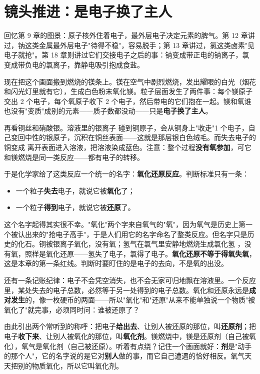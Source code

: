 \section{镜头推进：是电子换了主人}

回忆第 9 章的图景：原子核外住着电子，最外层电子决定元素的脾气。第 12 章讲过，钠这类金属最外层电子"待得不稳"，容易脱手；第 13 章讲过，氯这类卤素"见电子就抢"。第 18 章则讲过它们交接电子之后的事：钠变成带正电的钠离子，氯变成带负电的氯离子，靠静电吸引抱成食盐。

现在把这个画面搬到燃烧的镁条上。镁在空气中剧烈燃烧，发出耀眼的白光（烟花和闪光灯里就有它），生成白色粉末氧化镁。粒子层面发生了两件事：每个镁原子交出 2 个电子，每个氧原子收下 2 个电子，然后带电的它们抱在一起。镁和氧谁也没有"变质"成别的元素——质子数都没动——只是\textbf{电子换了主人}。

再看铜丝和硝酸银。溶液里的银离子  碰到铜原子，会从铜身上"收走"1 个电子，自己变回中性的银原子，沉积在铜丝表面——这就是那层银白色绒毛。而失去电子的铜变成  离开表面进入溶液，把溶液染成蓝色。注意：整个过程\textbf{没有氧参加}，可它和镁燃烧是同一类反应——都有电子的转移。

于是化学家给了这类反应一个统一的名字：\textbf{氧化还原反应}。判断标准只有一条：

\begin{itemize}[itemsep=2pt]
\item 一个粒子\textbf{失去}电子，就说它被\textbf{氧化}了；
\item 一个粒子\textbf{得到}电子，就说它被\textbf{还原}了。
\end{itemize}

这个名字起得其实很不幸。"氧化"两个字来自氧气的"氧"，因为氧气是历史上第一个被认出来的"抢电子高手"，于是人们用它的名字命名了整类反应。但名字只是历史的化石。铜被银离子氧化，没有氧；氢气在氯气里安静地燃烧生成氯化氢 ，没有氧，照样是氧化还原——氢失了电子，氯得了电子。\textbf{氧化还原不等于得氧失氧}，这是本章的第一条红线。判断时要盯住的是电子的去向，不是氧的出没。

还有一条记账纪律：电子不会凭空消失，也不会无家可归地飘在溶液里。一个反应里，某处失去的电子总数，必然等于另一处得到的电子总数。氧化和还原永远是\textbf{成对发生}的，像一枚硬币的两面——所以"氧化"和"还原"从来不能单独说一个物质"被氧化了"就完事，必须同时问：谁被还原了？

由此引出两个常听到的称呼：把电子\textbf{给出去}、让别人被还原的那位，叫\textbf{还原剂}；把电子\textbf{收下来}、让别人被氧化的那位，叫\textbf{氧化剂}。镁燃烧中，镁是还原剂（自己被氧化），氧气是氧化剂（自己被还原）。听着有点绕？记住一个画面就好：\textbf{剂}是"动手的那个人"，它的名字说的是它对\textbf{别人}做的事，而它自己遭遇的恰好相反。氧气天天把别的物质氧化，所以它叫氧化剂。

